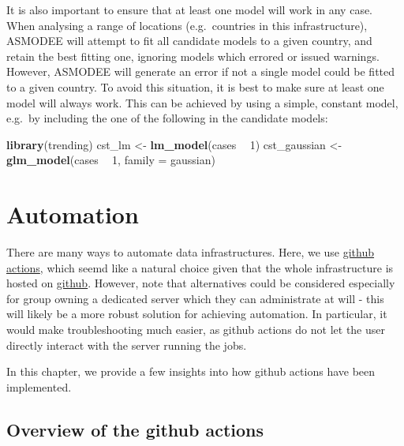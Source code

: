 \documentclass[]{book}
\newenvironment{Shaded}{\begin{snugshade}}{\end{snugshade}}
\newcommand{\DataTypeTok}[1]{\textcolor[rgb]{0.13,0.29,0.53}{#1}}
\newcommand{\DecValTok}[1]{\textcolor[rgb]{0.00,0.00,0.81}{#1}}
\newcommand{\KeywordTok}[1]{\textcolor[rgb]{0.13,0.29,0.53}{\textbf{#1}}}
\newcommand{\NormalTok}[1]{#1}
\newcommand{\OperatorTok}[1]{\textcolor[rgb]{0.81,0.36,0.00}{\textbf{#1}}}
\newcommand{\StringTok}[1]{\textcolor[rgb]{0.31,0.60,0.02}{#1}}
\begin{document}
It is also important to ensure that at least one model will work in any
case. When analysing a range of locations (e.g.~countries in this
infrastructure), ASMODEE will attempt to fit all candidate models to a given
country, and retain the best fitting one, ignoring models which errored or
issued warnings. However, ASMODEE will generate an error if not a single model
could be fitted to a given country. To avoid this situation, it is best to make
sure at least one model will always work. This can be achieved by using a
simple, constant model, e.g.~by including the one of the following in the
candidate models:

\begin{Shaded}
\begin{Highlighting}[]

\KeywordTok{library}\NormalTok{(trending)}
\NormalTok{cst_lm <-}\StringTok{ }\KeywordTok{lm_model}\NormalTok{(cases }\OperatorTok{~}\StringTok{ }\DecValTok{1}\NormalTok{)}
\NormalTok{cst_gaussian <-}\StringTok{ }\KeywordTok{glm_model}\NormalTok{(cases }\OperatorTok{~}\StringTok{ }\DecValTok{1}\NormalTok{, }\DataTypeTok{family =}\NormalTok{ gaussian)}
\end{Highlighting}
\end{Shaded}

\hypertarget{automation}{%
\chapter{Automation}\label{automation}}

There are many ways to automate data infrastructures. Here, we use \href{https://docs.github.com/en/actions}{github
actions}, which seemd like a natural choice
given that the whole infrastructure is hosted on
\href{https://github.com/whocov/trend_analysis_public}{github}. However, note that
alternatives could be considered especially for group owning a dedicated server
which they can administrate at will - this will likely be a more robust solution
for achieving automation. In particular, it would make troubleshooting much
easier, as github actions do not let the user directly interact with the server
running the jobs.

In this chapter, we provide a few insights into how github actions have been
implemented.

\hypertarget{overview-of-the-github-actions}{%
\section{Overview of the github actions}\label{overview-of-the-github-actions}}
\end{document}
